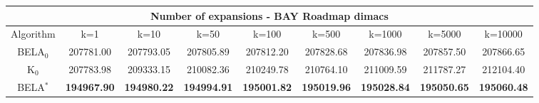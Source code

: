 \begin{tabular}{c|cccccccc}\toprule
\multicolumn{9}{c}{Number of expansions - BAY Roadmap dimacs}\\ \midrule
Algorithm & k=1 & k=10 & k=50 & k=100 & k=500 & k=1000 & k=5000 & k=10000 \\ \midrule
BELA$_0$ & 207781.00 & 207793.05 & 207805.89 & 207812.20 & 207828.68 & 207836.98 & 207857.50 & 207866.65 \\
K$_0$ & 207783.98 & 209333.15 & 210082.36 & 210249.78 & 210764.10 & 211009.59 & 211787.27 & 212104.40 \\
BELA$^*$ & \textbf{194967.90} & \textbf{194980.22} & \textbf{194994.91} & \textbf{195001.82} & \textbf{195019.96} & \textbf{195028.84} & \textbf{195050.65} & \textbf{195060.48} \\ \bottomrule 
\end{tabular}
